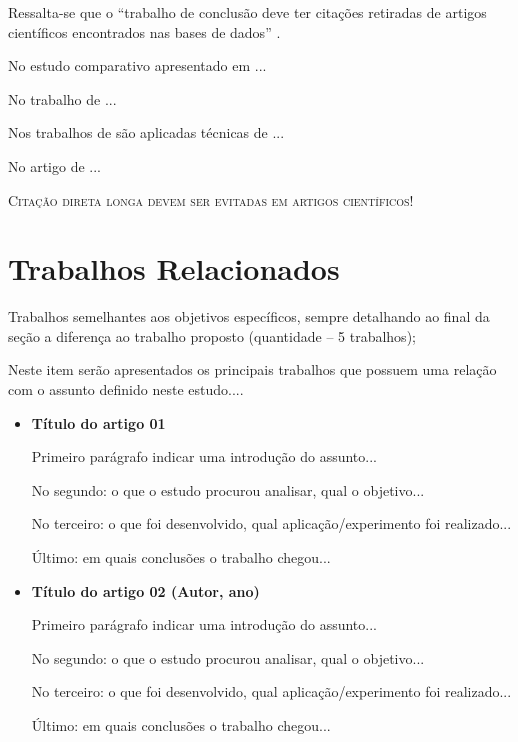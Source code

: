 \documentclass[12pt]{article}
\begin{document}
Ressalta-se que o \enquote{trabalho de conclusão deve ter citações retiradas de artigos científicos encontrados nas bases de dados} \cite{spinello2024}.

No estudo comparativo apresentado em \textcite[p. 107]{rabello2010} ...

No trabalho de \textcite{pargaonkar2021} ...

Nos trabalhos de \textcites{badgujar2024}{pargaonkar2021} são aplicadas técnicas de ...

No artigo de \textcite{estevao2023} ...

\textsc{Citação direta longa devem ser evitadas em artigos científicos!}

\section{Trabalhos Relacionados}

Trabalhos semelhantes aos objetivos específicos, sempre detalhando ao final da seção a
diferença ao trabalho proposto (quantidade -- 5 trabalhos);

Neste item serão apresentados os principais trabalhos que possuem uma relação com o assunto definido neste estudo....

\begin{itemize}
     \item \textbf{Título do artigo 01 \cite{ogliari2019}}
     
     Primeiro parágrafo indicar uma introdução do assunto...
     
     No segundo: o que o estudo procurou analisar, qual o objetivo...
     
     No terceiro: o que foi desenvolvido, qual aplicação/experimento foi realizado...
     
     Último: em quais conclusões o trabalho chegou...
    \newline
    
    \item \textbf{Título do artigo 02 (Autor, ano)}
    
     Primeiro parágrafo indicar uma introdução do assunto...
     
     No segundo: o que o estudo procurou analisar, qual o objetivo...
     
     No terceiro: o que foi desenvolvido, qual aplicação/experimento foi realizado...
     
     Último: em quais conclusões o trabalho chegou...
    
\end{itemize}
\end{document}
